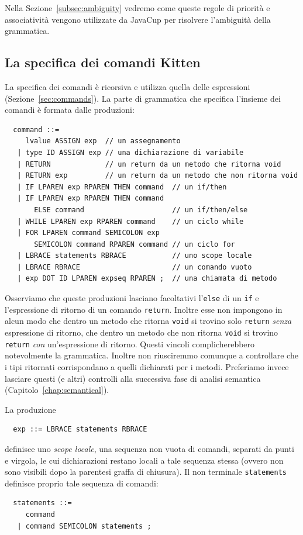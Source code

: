 Nella Sezione~\ref{subsec:ambiguity} vedremo come queste regole di priorit\`a e
associativit\`a vengono utilizzate da JavaCup per risolvere l'ambiguit\`a
della grammatica.
%
\subsection{La specifica dei comandi Kitten}
  \label{subsec:commands_specification}
%
La specifica dei comandi \`e ricorsiva e utilizza
quella delle espressioni (Sezione~\ref{sec:commands}).
La parte di grammatica che specifica l'insieme dei comandi \`e
formata dalle produzioni:
%
\begin{verbatim}
  command ::=
     lvalue ASSIGN exp  // un assegnamento
   | type ID ASSIGN exp // una dichiarazione di variabile
   | RETURN             // un return da un metodo che ritorna void
   | RETURN exp         // un return da un metodo che non ritorna void
   | IF LPAREN exp RPAREN THEN command  // un if/then
   | IF LPAREN exp RPAREN THEN command
       ELSE command                     // un if/then/else
   | WHILE LPAREN exp RPAREN command    // un ciclo while
   | FOR LPAREN command SEMICOLON exp
       SEMICOLON command RPAREN command // un ciclo for
   | LBRACE statements RBRACE           // uno scope locale
   | LBRACE RBRACE                      // un comando vuoto
   | exp DOT ID LPAREN expseq RPAREN ;  // una chiamata di metodo
\end{verbatim}
%
Osserviamo che queste produzioni lasciano facoltativi
l'\texttt{else} di un \texttt{if} e l'espressione di ritorno di
un comando \texttt{return}. Inoltre esse non impongono
in alcun modo che dentro un metodo che ritorna \texttt{void}
si trovino solo \texttt{return} \emph{senza} espressione di ritorno,
\nec che dentro un metodo che non ritorna \texttt{void} si trovino
\texttt{return} \emph{con} un'espressione di ritorno. Questi vincoli
complicherebbero notevolmente la grammatica. Inoltre non riusciremmo
comunque a controllare che i tipi ritornati corrispondano a quelli
dichiarati per i metodi. Preferiamo invece lasciare questi
(e altri) controlli alla successiva fase di analisi semantica
(Capitolo~\ref{chap:semantical}).

La produzione
%
\begin{verbatim}
  exp ::= LBRACE statements RBRACE
\end{verbatim}
%
definisce uno \emph{scope locale}, \cioe una sequenza non vuota di comandi,
separati da punti e virgola, le cui dichiarazioni restano locali
a tale sequenza stessa (ovvero non sono \piu visibili dopo la
parentesi graffa di chiusura). Il non terminale \texttt{statements}
definisce proprio tale sequenza di comandi:
%
\begin{verbatim}
  statements ::=
     command
   | command SEMICOLON statements ;
\end{verbatim}
%
